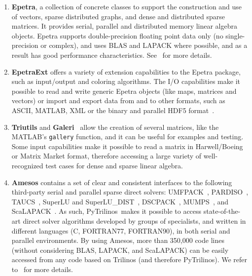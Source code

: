 \documentclass[acmtocl]{acmtrans2m}
\newcommand{\PyTrilinos}{{PyTrilinos}}
\begin{document}
\begin{enumerate}

\item {\bf Epetra}, a collection of concrete classes to support the
  construction and use of vectors, sparse distributed graphs, and
  dense and distributed sparse matrices.  It provides serial, parallel
  and distributed memory linear algebra objects.  Epetra supports
  double-precision floating point data only (no single-precision or
  complex), and uses BLAS and LAPACK where possible, and as a result
  has good performance characteristics.  See~\cite{epetra-guide} for
  more details.

\item {\bf EpetraExt} offers a variety of extension capabilities to
  the Epetra package, such as input/output and coloring algorithms.
  The I/O capabilities make it possible to read and write generic
  Epetra objects (like maps, matrices and vectors) or import and
  export data from and to other formats, such as ASCII, MATLAB, XML or the 
  binary and parallel HDF5 format~\cite{epetraext_io,hdf5-sc}.

\item {\bf Triutils} and {\bf Galeri}~\cite{Galeri-home-page}
  allow the creation of several matrices, like the
  MATLAB's {\tt gallery} function, and it can be useful for examples
  and testing.  Some input capabilities make it possible to read a
  matrix in Harwell/Boeing or Matrix Market format, therefore
  accessing a large variety of well-recognized test cases for dense
  and sparse linear algebra.

\item {\bf Amesos} contains a set of clear and consistent interfaces
  to the following third-party serial and parallel sparse direct
  solvers: UMFPACK~\cite{umfpack-acm-toms},
  PARDISO~\cite{oskl:04-etna,sg:04-fgcs},
  TAUCS~\cite{rozin04locality,rotkin04design,irony04parallel}, SuperLU
  and SuperLU\_DIST~\cite{superlu-manual},
  DSCPACK~\cite{dscpack-manual}, MUMPS~\cite{mumps-manual}, and
  ScaLAPACK~\cite{scalapack-book,scalapack}.  As such,
  \PyTrilinos\ makes it possible to access state-of-the-art direct
  solver algorithms developed by groups of specialists, and written in
  different languages (C, FORTRAN77, FORTRAN90), in both serial and
  parallel environments.  By using Amesos, more than 350,000 code
  lines (without considering BLAS, LAPACK, and ScaLAPACK) can be
  easily accessed from any code based on Trilinos (and therefore
  \PyTrilinos).  We refer
  to~\cite{Amesos-Reference-Guide,Amesos-Design} for more details.


\end{enumerate}
\end{document}
